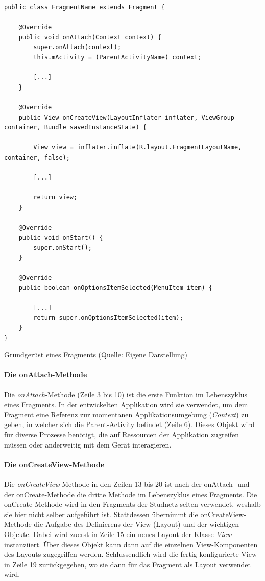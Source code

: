 \documentclass[../main.tex]{subfiles}
\begin{document}
	\begin{code}
		\begin{center}
			\begin{verbatim}
public class FragmentName extends Fragment {
			
	@Override
	public void onAttach(Context context) {
		super.onAttach(context);
		this.mActivity = (ParentActivityName) context;
		
		[...]
	}
	
	@Override
	public View onCreateView(LayoutInflater inflater, ViewGroup container, Bundle savedInstanceState) {
	
		View view = inflater.inflate(R.layout.FragmentLayoutName, container, false);

		[...]
		
		return view;
	}
			
	@Override
	public void onStart() {
		super.onStart();
	}
			
	@Override
	public boolean onOptionsItemSelected(MenuItem item) {
			
		[...]
		return super.onOptionsItemSelected(item);
	}
}	
			\end{verbatim}
			\caption{Grundgerüst eines Fragments (Quelle: Eigene Darstellung)}
			\label{fragmentStructure}
		\end{center}
		
	\end{code}

	\paragraph{Die onAttach-Methode}
	Die \emph{onAttach}-Methode (Zeile 3 bis 10) ist die erste Funktion im Lebenszyklus eines Fragments. In der entwickelten Applikation wird sie verwendet, um dem Fragment eine Referenz zur momentanen Applikationsumgebung (\emph{Context}) zu geben, in welcher sich die Parent-Activity befindet (Zeile 6). Dieses Objekt wird für diverse Prozesse benötigt, die auf Ressourcen der Applikation zugreifen müssen oder anderweitig mit dem Gerät interagieren. \cite{context}
	
	\paragraph{Die onCreateView-Methode}
	Die \emph{onCreateView}-Methode in den Zeilen 13 bis 20 ist nach der onAttach- und der onCreate-Methode die dritte Methode im Lebenszyklus eines Fragments. Die onCreate-Methode wird in den Fragments der Studnetz selten verwendet, weshalb sie hier nicht selber aufgeführt ist. Stattdessen übernimmt die onCreateView-Methode die Aufgabe des Definierens der View (Layout) und der wichtigen Objekte. Dabei wird zuerst in Zeile 15 ein neues Layout der Klasse \emph{View} instanziiert. Über dieses Objekt kann dann auf die einzelnen View-Komponenten des Layouts zugegriffen werden. Schlussendlich wird die fertig konfigurierte View in Zeile 19 zurückgegeben, wo sie dann für das Fragment als Layout verwendet wird.
	
\end{document}
